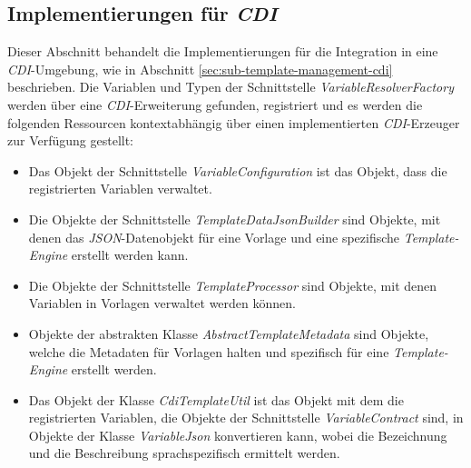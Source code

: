 \subsection{Implementierungen für \emph{CDI}}
\label{sec:sub-impl-integartion-cdi}
Dieser Abschnitt behandelt die Implementierungen für die Integration in eine \emph{CDI}-Umgebung, wie in Abschnitt \ref{sec:sub-template-management-cdi} beschrieben. Die Variablen und Typen der Schnittstelle \emph{VariableResolverFactory} werden über eine \emph{CDI}-Erweiterung gefunden,  registriert und es werden die folgenden Ressourcen kontextabhängig über einen implementierten \emph{CDI}-Erzeuger zur Verfügung gestellt: 
\begin{itemize}
 \item Das Objekt der Schnittstelle \emph{VariableConfiguration} 
 \newline
 ist das Objekt, dass die registrierten Variablen verwaltet.
 \item Die Objekte der Schnittstelle \emph{TemplateDataJsonBuilder}
 \newline
 sind Objekte, mit denen das \emph{JSON}-Datenobjekt für eine Vorlage und eine spezifische \emph{Template-Engine} erstellt werden kann.
 \item Die Objekte der Schnittstelle \emph{TemplateProcessor}
 \newline
 sind Objekte, mit denen Variablen in Vorlagen verwaltet werden können.
 \item Objekte der abstrakten Klasse \emph{AbstractTemplateMetadata}
 \newline
 sind Objekte, welche die Metadaten für Vorlagen halten und spezifisch für eine \emph{Template-Engine} erstellt werden.
 \item Das Objekt der Klasse \emph{CdiTemplateUtil}
 \newline
 ist das Objekt mit dem die registrierten Variablen, die Objekte der Schnittstelle \emph{VariableContract} sind, in Objekte der Klasse \emph{VariableJson} konvertieren kann, wobei die Bezeichnung und die Beschreibung sprachspezifisch ermittelt werden.
\end{itemize}

